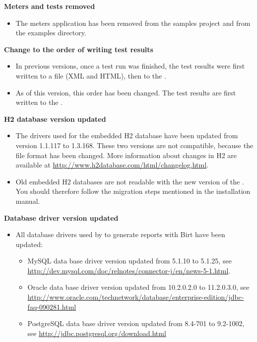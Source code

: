 \textbf{Meters \gdaut{} and tests removed}
\begin{itemize}
\item The meters application has been removed from the samples project and from the examples directory.
\end{itemize}

\textbf{Change to the order of writing test results}
\begin{itemize}
\item In previous versions, once a test run was finished, the test results were first written to a file (XML and HTML), then to the \gddb{}.
\item As of this version, this order has been changed. The test results are first written to the \gddb{}.
\end{itemize}


\textbf{H2 database version updated}
\begin{itemize}
\item The drivers used for the embedded H2 database have been updated from version 1.1.117 to 1.3.168. These two versions are not compatible, because the file format has been changed. More information about changes in H2 are available at \url{http://www.h2database.com/html/changelog.html}.
\item Old embedded H2 databases are not readable with the new version
    of the \ite{}. You should therefore follow the migration steps mentioned in the installation manual. 
 
\end{itemize}

\textbf{Database driver version updated}
\begin{itemize}
\item All database drivers used by \ite to generate reports with Birt have been
    updated:
    \begin{itemize}
    \item MySQL data base driver version updated from 5.1.10 to 5.1.25,
        see \url{http://dev.mysql.com/doc/relnotes/connector-j/en/news-5-1.html}.
    \item Oracle data base driver version updated from 10.2.0.2.0 to 11.2.0.3.0,
        see \url{http://www.oracle.com/technetwork/database/enterprise-edition/jdbc-faq-090281.html}
    \item PostgreSQL data base driver version updated from 8.4-701 to 9.2-1002,
        see \url{http://jdbc.postgresql.org/download.html}
    \end{itemize}
\end{itemize}

